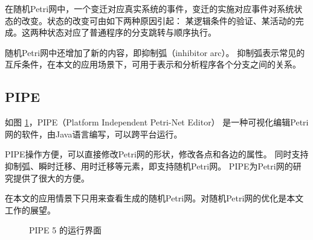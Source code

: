 在随机Petri网中，一个变迁对应真实系统的事件，变迁的实施对应事件对系统状态的改变。状态的改变可由如下两种原因引起：
某逻辑条件的验证、某活动的完成。这两种状态对应了普通程序的分支跳转与顺序执行。

随机Petri网中还增加了新的内容，即抑制弧（inhibitor arc）。
抑制弧表示常见的互斥条件，在本文的应用场景下，可用于表示和分析程序各个分支之间的关系。







\subsection{PIPE}
如图 \ref{fig:pipeshot}，PIPE（Platform Independent Petri-Net Editor）\cite{pipe5}
是一种可视化编辑Petri网的软件，由Java语言编写，可以跨平台运行。

PIPE操作方便，可以直接修改Petri网的形状，修改各点和各边的属性。
同时支持抑制弧、瞬时迁移、用时迁移等元素，即支持随机Petri网。
PIPE为Petri网的研究提供了很大的方便。

在本文的应用情景下只用来查看生成的随机Petri网。对随机Petri网的优化是本文工作的展望。

\newsavebox{\pipeshot}
\begin{figure}[!hbt]
\centering
\usebox{\pipeshot}
\caption{PIPE 5 的运行界面} \label{fig:pipeshot}
\end{figure}
